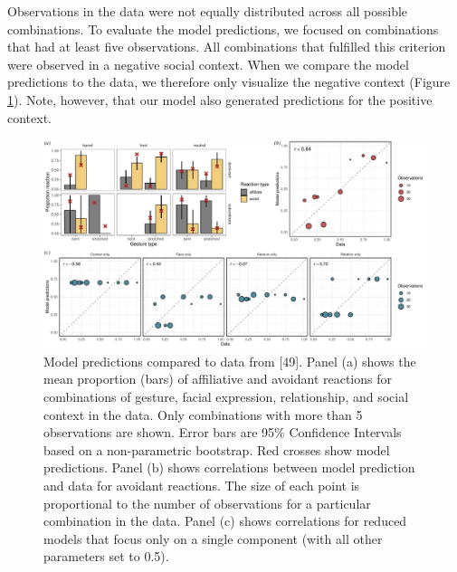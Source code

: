 \documentclass[
  man,floatsintext]{apa6}
\begin{document}
Observations in the data were not equally distributed across all possible combinations. To evaluate the model predictions, we focused on combinations that had at least five observations. All combinations that fulfilled this criterion were observed in a negative social context. When we compare the model predictions to the data, we therefore only visualize the negative context (Figure \ref{fig:fig2}). Note, however, that our model also generated predictions for the positive context.



\begin{figure}

{\centering \includegraphics[width=1\linewidth]{./figures/Fig2} 

}

\caption{Model predictions compared to data from {[}49{]}. Panel (a) shows the mean proportion (bars) of affiliative and avoidant reactions for combinations of gesture, facial expression, relationship, and social context in the data. Only combinations with more than 5 observations are shown. Error bars are 95\% Confidence Intervals based on a non-parametric bootstrap. Red crosses show model predictions. Panel (b) shows correlations between model prediction and data for avoidant reactions. The size of each point is proportional to the number of observations for a particular combination in the data. Panel (c) shows correlations for reduced models that focus only on a single component (with all other parameters set to 0.5).}\label{fig:fig2}
\end{figure}
\end{document}
